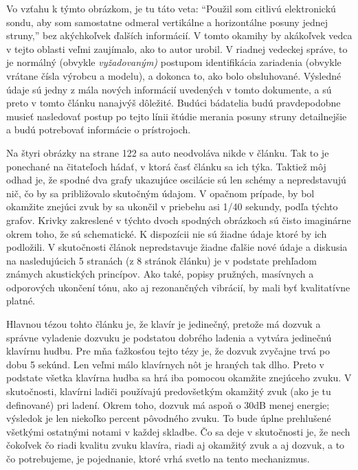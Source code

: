 \documentclass[11pt,a4paper]{book}
\begin{document}
Vo vzťahu k týmto obrázkom, je tu táto veta: “Použil som citlivú elektronickú sondu, aby som samostatne odmeral vertikálne a horizontálne posuny jednej struny,” bez akýchkoľvek ďalších informácií. V tomto okamihy by akákoľvek vedca v tejto oblasti veľmi zaujímalo, ako to autor urobil. V riadnej vedeckej správe, to je normálný (obvykle \textit{vyžadovaným)} postupom identifikácia zariadenia (obvykle vrátane čísla výrobcu a modelu), a dokonca to, ako bolo obsluhované. Výsledné údaje sú jedny z mála nových informácií uvedených v tomto dokumente, a sú preto v tomto článku nanajvýš dôležité. Budúci bádatelia budú pravdepodobne musieť nasledovať postup po tejto línii štúdie merania posuny struny detailnejšie a budú potrebovať informácie o prístrojoch. 

Na štyri obrázky na strane 122 sa auto neodvoláva nikde v článku. Tak to je ponechané na čitateľoch hádať, v ktorá časť článku sa ich týka. Taktiež môj odhad je, že spodné dva grafy ukazujúce oscilácie sú len schémy a nepredstavujú nič, čo by sa približovalo skutočným údajom. V opačnom prípade, by bol okamžite znejúci zvuk by sa ukončil v priebehu asi 1/40 sekundy, podľa týchto grafov. Krivky zakreslené v týchto dvoch spodných obrázkoch sú čisto imaginárne okrem toho, že sú schematické. K dispozícii nie sú žiadne údaje ktoré by ich podložili. V skutočnosti článok nepredstavuje žiadne ďalšie nové údaje a diskusia na nasledujúcich 5 stranách (z 8 stránok článku) je v podstate prehľadom známych akustických princípov. Ako také, popisy pružných, masívnych a odporových ukončení tónu, ako aj rezonančných vibrácií, by mali byť kvalitatívne platné. 

Hlavnou tézou tohto článku je, že klavír je jedinečný, pretože má dozvuk a správne vyladenie dozvuku je podstatou dobrého ladenia a vytvára jedinečnú klavírnu hudbu. Pre mňa ťažkosťou tejto tézy je, že dozvuk zvyčajne trvá po dobu 5 sekúnd. Len veľmi málo klavírnych nôt je hraných tak dlho. Preto v podstate všetka klavírna hudba sa hrá iba pomocou okamžite znejúceho zvuku. V skutočnosti, klavírni ladiči používajú predovšetkým okamžitý zvuk (ako je tu definované) pri ladení. Okrem toho, dozvuk má  aspoň o 30dB menej energie; výsledok je len niekoľko percent pôvodného zvuku. To bude úplne prehlušené  všetkými ostatnými notami v každej skladbe. Čo sa deje v skutočnosti je, že nech čokoľvek čo riadi kvalitu zvuku klavíra, riadi aj okamžitý zvuk a aj dozvuk, a to čo potrebujeme, je pojednanie, ktoré vrhá svetlo na tento mechanizmus. 
\end{document}
